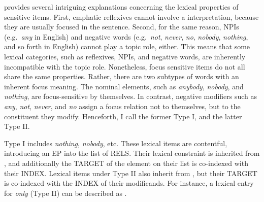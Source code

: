 \citet{lambrecht:96} provides several intriguing explanations
concerning the lexical properties of  sensitive items. First, emphatic reflexives cannot involve a 
interpretation, because they are usually focused in the
sentence. Second, for the same reason, NPIs (e.g.\ \textit{any} in
English) and negative words (e.g.\ \textit{not}, \textit{never},
\textit{no}, \textit{nobody}, \textit{nothing}, and so forth in
English) cannot play a topic role, either. This means that some
lexical categories, such as reflexives, NPIs, and negative words, are
inherently incompatible with the topic role. Nonetheless, focus
sensitive items do not all share the same properties.  Rather, there
are two subtypes of words with an inherent focus meaning. The nominal
elements, such as \textit{anybody}, \textit{nobody}, and
\textit{nothing}, are focus-sensitive by themselves. In contrast,
negative modifiers such as \textit{any}, \textit{not},
\textit{never}, and \textit{no} assign a focus relation not to
themselves, but to the constituent they modify. Henceforth, I call the
former Type I, and the latter Type II.




\noindent Type I includes \textit{nothing}, \textit{nobody},
etc. These lexical items are contentful, introducing an EP into the
list of RELS. Their lexical constraint is inherited from
, and additionally the TARGET of the element
on their  list is co-indexed with their INDEX.  Lexical
items under Type II also inherit from , but
their TARGET is co-indexed with the INDEX of their modificands.  For
instance, a lexical entry for \textit{only} (Type II) can be described
as . 



